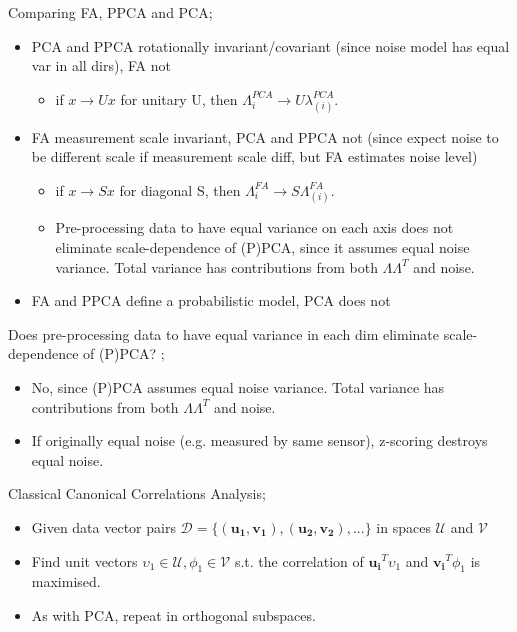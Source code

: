 \documentclass{article}
\begin{document}
Comparing FA, PPCA and PCA; \begin{itemize} \item PCA and PPCA rotationally invariant/covariant (since noise model has equal var in all dirs), FA not \begin{itemize} \item if $x\rightarrow Ux$ for unitary U, then $\Lambda^{PCA}_{i}\rightarrow U \lambda^{PCA}_{(i)}$.  \end{itemize} \item FA measurement scale invariant, PCA and PPCA not (since expect noise to be different scale if measurement scale diff, but FA estimates noise level) \begin{itemize} \item if $x\rightarrow Sx$ for diagonal S, then $\Lambda^{FA}_{i}\rightarrow S \Lambda^{FA}_{(i)}$.  \item Pre-processing data to have equal variance on each axis does not eliminate scale-dependence of (P)PCA, since it assumes equal noise variance. Total variance has contributions from both $\Lambda\Lambda^T$ and noise.  \end{itemize} \item FA and PPCA define a probabilistic model, PCA does not \end{itemize}

Does pre-processing data to have equal variance in each dim eliminate scale-dependence of (P)PCA? ;\begin{itemize} \item No, since (P)PCA assumes equal noise variance. Total variance has contributions from both $\Lambda\Lambda^T$ and noise.  \item If originally equal noise (e.g. measured by same sensor), z-scoring destroys equal noise.  \end{itemize}

Classical Canonical Correlations Analysis; \begin{itemize} \item Given data vector pairs $\mathcal{D}=\{(\mathbf{u_1, v_1}), \mathbf{(u_2, v_2)},...\}$ in spaces $\mathcal{U}$ and $\mathcal{V}$ \item Find unit vectors $\upsilon_1\in\mathcal{U}, \phi_1\in\mathcal{V}$ s.t. the correlation of $\mathbf{u_i}^T\upsilon_1$ and $\mathbf{v_i}^T\phi_1$ is maximised.  \item As with PCA, repeat in orthogonal subspaces.  \end{itemize}
\end{document}
